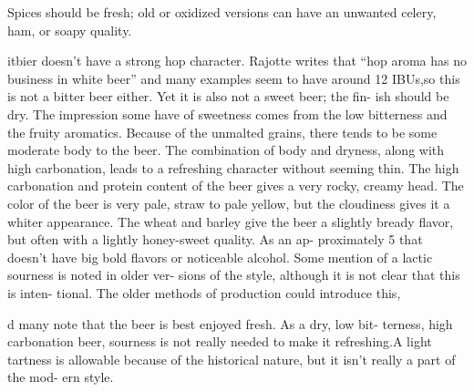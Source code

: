 \documentclass[a4paper,parskip=half]{scrartcl}
\begin{document}
Spices should be fresh; old
or oxidized versions can have an unwanted celery, ham, or
soapy quality.

itbier doesn’t have a strong hop character. Rajotte
writes that “hop aroma has no business in white beer” and
many examples seem to have around 12 IBUs,so this is not
a bitter beer either. Yet it is also not a sweet beer; the fin-
ish should be dry. The impression some have of sweetness
comes from the low bitterness and the fruity aromatics.
Because of the unmalted grains, there tends to be some
moderate body to the beer. The combination of body and
dryness, along with high carbonation, leads to a refreshing
character without seeming thin. The high carbonation and
protein content of the beer gives a very rocky, creamy head.
The color of the beer is very pale, straw to pale yellow, but
the cloudiness gives it a whiter appearance.
The wheat and barley give the beer a slightly bready
flavor, but often with a lightly honey-sweet quality. As an ap-
proximately 5%
that doesn’t have big bold flavors or noticeable alcohol.
Some mention of a lactic sourness is noted in older ver-
sions of the style, although it is not clear that this is inten-
tional. The older methods of production could introduce this, 

d many note that the beer is best enjoyed fresh.
As a dry, low bit-
terness, high carbonation beer, sourness is not really needed
to make it refreshing.A light tartness is allowable because
of the historical nature, but it isn’t really a part of the mod-
ern style.
\end{document}
